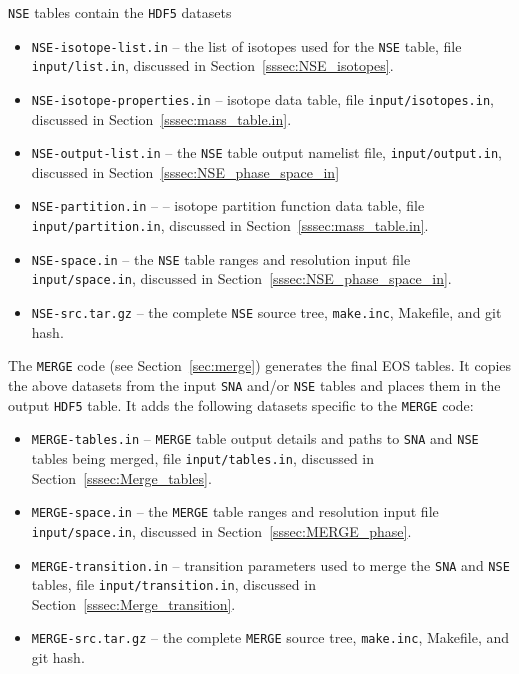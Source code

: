 \documentclass[letterpaper,11pt]{refart}
\begin{document}
\texttt{NSE} tables contain the \texttt{HDF5} datasets
\begin{itemize}
  
\item \texttt{NSE-isotope-list.in} -- the list of isotopes used for
  the \texttt{NSE} table, file \texttt{\color{red}input/list.in}, discussed in Section~\ref{sssec:NSE_isotopes}.
\item \texttt{NSE-isotope-properties.in} -- isotope data table, file \texttt{\color{red}input/isotopes.in}, discussed in Section~\ref{sssec:mass_table.in}.
\item \texttt{NSE-output-list.in} -- the \texttt{NSE} table output namelist file, \texttt{\color{red}input/output.in}, discussed in Section~\ref{sssec:NSE_phase_space_in}     
\item \texttt{NSE-partition.in} -- -- isotope partition function data table, file \texttt{\color{red}input/partition.in}, discussed in Section~\ref{sssec:mass_table.in}.
\item \texttt{NSE-space.in} -- the \texttt{NSE} table ranges and resolution input file \texttt{\color{red}input/space.in}, discussed in Section~\ref{sssec:NSE_phase_space_in}.
\item \texttt{NSE-src.tar.gz} -- the complete \texttt{NSE} source tree, \texttt{make.inc}, Makefile, and git hash.
\end{itemize}

The \texttt{MERGE} code (see Section~\ref{sec:merge}) generates the
final EOS tables. It copies the above datasets from the input
\texttt{SNA} and/or \texttt{NSE} tables and places them in the output
\texttt{HDF5} table. It adds the following datasets specific to the \texttt{MERGE} code:
\begin{itemize}

\item \texttt{MERGE-tables.in} -- \texttt{MERGE} table output details and paths to \texttt{SNA} and \texttt{NSE} tables being merged, file \texttt{\color{red}input/tables.in}, discussed in Section~\ref{sssec:Merge_tables}. 
\item \texttt{MERGE-space.in} --  the \texttt{MERGE} table ranges and resolution input file \texttt{\color{red}input/space.in}, discussed in Section~\ref{sssec:MERGE_phase}.
\item \texttt{MERGE-transition.in} -- transition parameters used to merge the \texttt{SNA} and \texttt{NSE} tables, file \texttt{\color{red}input/transition.in}, discussed in Section~\ref{sssec:Merge_transition}. 
\item \texttt{MERGE-src.tar.gz} -- the complete \texttt{MERGE} source tree, \texttt{make.inc}, Makefile, and git hash.

\end{itemize}
\end{document}
